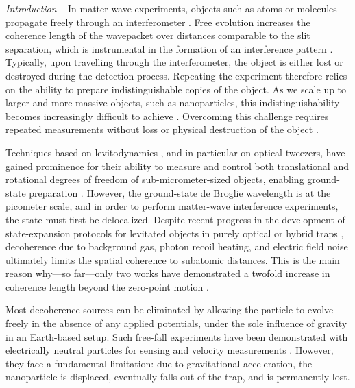 \documentclass[twocolumn,preprintnumbers,superscriptaddress,amsmath,amssymb,aps,pra,10pt]{revtex4-1}
\newcommand{\<}{\langle}
\renewcommand{\>}{\rangle}
\renewcommand{\>}{\rangle}
\begin{document}
\textit{Introduction} – In matter-wave experiments, objects such as atoms or molecules propagate freely through an interferometer \cite{kovachy2015quantum,Aveline2020,Fein2019}.
%
Free evolution increases the coherence length of the wavepacket over distances comparable to the slit separation, which is instrumental in the formation of an interference pattern \cite{Keith1991,Nairz2003}.
%
Typically, upon travelling through the interferometer, the object is either lost or destroyed during the detection process.
%
Repeating the experiment therefore relies on the ability to prepare indistinguishable copies of the object.
%
As we scale up to larger and more massive objects, such as nanoparticles, this indistinguishability becomes increasingly difficult to achieve \cite{Romero-Isart2011b}.
%
Overcoming this challenge requires repeated measurements without loss or physical destruction of the object \cite{Weiss2021,Roda-Llordes2024,Neumeier2024}.



Techniques based on levitodynamics \cite{Gonzalez-Ballestero2021}, and in particular on optical tweezers, have gained prominence for their ability to measure and control both translational and rotational degrees of freedom of sub-micrometer-sized objects, enabling ground-state preparation \cite{Delic2020, magrini2021real, ours2021, dania2024high}.
%
However, the ground-state de Broglie wavelength is at the picometer scale, and in order to perform matter-wave interference experiments, the state must first be delocalized.
%
Despite recent progress in the development of state-expansion protocols for levitated objects in purely optical \cite{Rashid2016,Duchan2024} or hybrid traps \cite{Bonvin2024, Tomassi2025}, decoherence due to background gas, photon recoil heating, and electric field noise ultimately limits the spatial coherence to subatomic distances.
%
This is the main reason why—so far—only two works have demonstrated a twofold increase in coherence length beyond the zero-point motion \cite{Rossi2024,Kamba2025}.


Most decoherence sources can be eliminated by allowing the particle to evolve freely in the absence of any applied potentials, under the sole influence of gravity in an Earth-based setup.
%
Such free-fall experiments have been demonstrated with electrically neutral particles for sensing \cite{Hebestreit2018b} and velocity measurements \cite{Kamba2023}.
%
However, they face a fundamental limitation: due to gravitational acceleration, the nanoparticle is displaced, eventually falls out of the trap, and is permanently lost.
\end{document}

